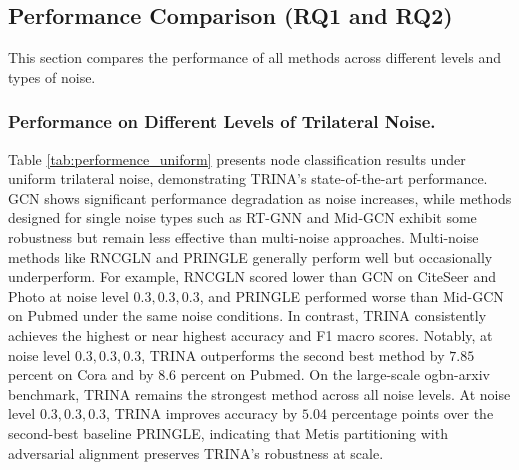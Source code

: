 \documentclass[sigconf, anonymous, review]{acmart}
\begin{document}
  \subsection{Performance Comparison (RQ1 and RQ2)}
    This section compares the performance of all methods across different levels and types of noise.
    \subsubsection{Performance on Different Levels of Trilateral Noise.} 
      Table \ref{tab:performence_uniform} presents node classification results under uniform trilateral noise, demonstrating TRINA’s state-of-the-art performance. GCN shows significant performance degradation as noise increases, while methods designed for single noise types such as RT-GNN and Mid-GCN exhibit some robustness but remain less effective than multi-noise approaches. Multi-noise methods like RNCGLN and PRINGLE generally perform well but occasionally underperform. For example, RNCGLN scored lower than GCN on CiteSeer and Photo at noise level ${0.3,0.3,0.3}$, and PRINGLE performed worse than Mid-GCN on Pubmed under the same noise conditions. In contrast, TRINA consistently achieves the highest or near highest accuracy and F1 macro scores. Notably, at noise level ${0.3,0.3,0.3}$, TRINA outperforms the second best method by $7.85$ percent on Cora and by $8.6$ percent on Pubmed.
      On the large-scale ogbn-arxiv benchmark, TRINA remains the strongest method across all noise levels. At noise level ${0.3,0.3,0.3}$, TRINA improves accuracy by $5.04$ percentage points over the second-best baseline PRINGLE, indicating that Metis partitioning with adversarial alignment preserves TRINA's robustness at scale.
\end{document}
